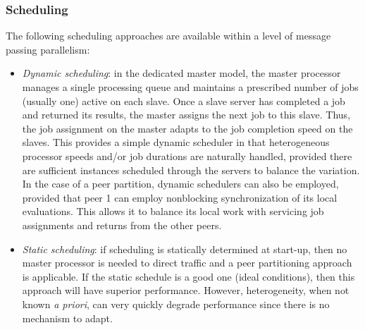 \subsubsection{Scheduling}\label{parallel:SLP:message:sched}

The following scheduling approaches are available within a level of
message passing parallelism:

\begin{itemize}
\item \emph{Dynamic scheduling}: in the dedicated master model, the
  master processor manages a single processing queue and maintains a
  prescribed number of jobs (usually one) active on each slave. Once a
  slave server has completed a job and returned its results, the
  master assigns the next job to this slave. Thus, the job assignment
  on the master adapts to the job completion speed on the slaves. This
  provides a simple dynamic scheduler in that heterogeneous processor
  speeds and/or job durations are naturally handled, provided there
  are sufficient instances scheduled through the servers to balance
  the variation.  In the case of a peer partition, dynamic schedulers
  can also be employed, provided that peer 1 can employ nonblocking
  synchronization of its local evaluations.  This allows it to balance
  its local work with servicing job assignments and returns from the
  other peers.
\item \emph{Static scheduling}: if scheduling is statically determined
  at start-up, then no master processor is needed to direct traffic
  and a peer partitioning approach is applicable. If the static
  schedule is a good one (ideal conditions), then this approach will
  have superior performance. However, heterogeneity, when not known
  \emph{a priori}, can very quickly degrade performance since there is
  no mechanism to adapt.
\end{itemize}


